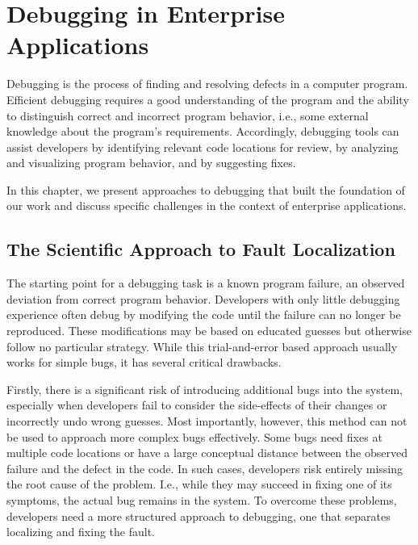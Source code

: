 \chapter{Debugging in Enterprise Applications}

Debugging is the process of finding and resolving defects in a computer program.
Efficient debugging requires a good understanding of the program and the ability to distinguish correct and incorrect program behavior, i.e., some external knowledge about the program's requirements.
Accordingly, debugging tools can assist developers by identifying relevant code locations for review, by analyzing and visualizing program behavior, and by suggesting fixes.

In this chapter, we present approaches to debugging that built the foundation of our work and discuss specific challenges in the context of enterprise applications.

\section{The Scientific Approach to Fault Localization}

The starting point for a debugging task is a known program failure, an observed deviation from correct program behavior.
Developers with only little debugging experience often debug by modifying the code until the failure can no longer be reproduced.
These modifications may be based on educated guesses but otherwise follow no particular strategy.
While this trial-and-error based approach usually works for simple bugs, it has several critical drawbacks.

Firstly, there is a significant risk of introducing additional bugs into the system, especially when developers fail to consider the side-effects of their changes or incorrectly undo wrong guesses.
Most importantly, however, this method can not be used to approach more complex bugs effectively.
Some bugs need fixes at multiple code locations or have a large conceptual distance between the observed failure and the defect in the code.
In such cases, developers risk entirely missing the root cause of the problem.
I.e., while they may succeed in fixing one of its symptoms, the actual bug remains in the system.
To overcome these problems, developers need a more structured approach to debugging, one that separates localizing and fixing the fault.

